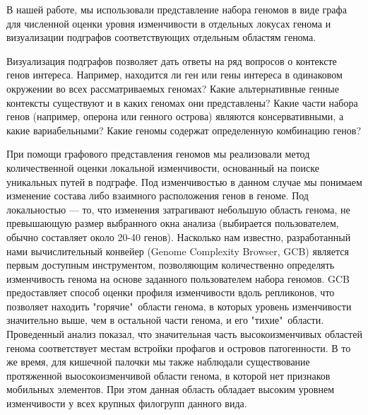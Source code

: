 В нашей работе, мы использовали представление набора геномов в виде графа для численной оценки уровня изменчивости в отдельных локусах генома и визуализации подграфов соответствующих отдельным областям генома. 

Визуализация подграфов позволяет дать ответы на ряд вопросов о контексте генов интереса. Например, находится ли ген или гены интереса в одинаковом окружении во всех рассматриваемых геномах? Какие альтернативные генные контексты существуют и в каких геномах они представлены? Какие части набора генов (например, оперона или генного острова) являются консервативными, а какие вариабельными? Какие геномы содержат определенную комбинацию генов? 

При помощи графового представления геномов мы реализовали метод количественной оценки локальной изменчивости, основанный на поиске уникальных путей в подграфе. Под изменчивостью в данном случае мы понимаем изменение состава либо взаимного расположения генов в геноме. Под локальностью --- то, что изменения затрагивают небольшую область генома, не превышающую размер выбранного окна анализа (выбирается пользователем, обычно составляет около 20-40 генов). Насколько нам известно, разработанный нами вычислительный конвейер (Genome Complexity Browser, GCB) является первым доступным инструментом, позволяющим количественно определять изменчивость генома на основе заданного пользователем набора геномов. GCB предоставляет способ оценки профиля изменчивости вдоль репликонов, что позволяет находить "горячие"\ области генома, в которых уровень изменчивости значительно выше, чем в остальной части генома, и его "тихие"\ области. Проведенный анализ показал, что значительная часть высокоизменчивых областей генома соответствует местам встройки профагов и островов патогенности. В то же время, для кишечной палочки мы также наблюдали существование протяженной выосокоизменчивой области генома, в которой нет признаков мобильных элементов. При этом данная область обладает высоким уровнем изменчивости у всех крупных филогрупп данного вида. 

